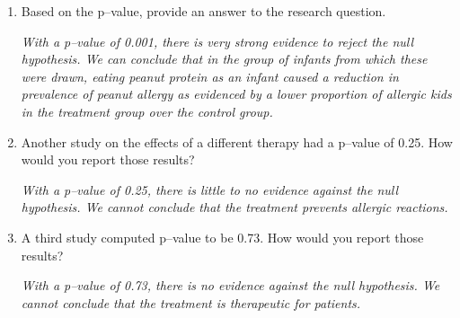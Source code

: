 \begin{enumerate}
 
    \item  Based on the p--value, provide an answer to the research
      question.  
\begin{students}
\vspace{2cm}
\end{students}
\begin{key}
  {\it        With a p--value of 0.001, there is very  strong evidence to
      reject the null hypothesis.  We can conclude that in the
     group of infants from which these were drawn, eating peanut
     protein as an infant caused a reduction in prevalence of peanut
     allergy as evidenced by a lower proportion
      of allergic kids in the treatment group over the
      control group. }
\end{key}

    \item   Another study on the effects of a different therapy had a
      p--value of 0.25.  How would you report those results? 
\begin{students}
\vspace{3cm}
\end{students}

\begin{key}
  {\it       With a p--value of 0.25, there is little to no evidence
      against the null hypothesis.  We cannot conclude that
     the treatment prevents allergic reactions.  }
\end{key}



    \item  A third study computed p--value to be 0.73. How would you
      report those results?   
\begin{students}
\vspace*{3cm}
\end{students}

\begin{key}
  {\it        With a p--value of 0.73, there is  no evidence
      against the null hypothesis.  We cannot conclude that
      the treatment is therapeutic for patients. }
\end{key}



\end{enumerate}
